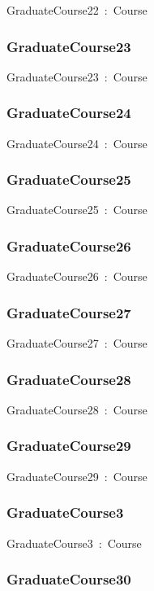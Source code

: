 \documentclass{article}
\begin{document}
GraduateCourse22~:~Course

\subsubsection*{GraduateCourse23}

GraduateCourse23~:~Course

\subsubsection*{GraduateCourse24}

GraduateCourse24~:~Course

\subsubsection*{GraduateCourse25}

GraduateCourse25~:~Course

\subsubsection*{GraduateCourse26}

GraduateCourse26~:~Course

\subsubsection*{GraduateCourse27}

GraduateCourse27~:~Course

\subsubsection*{GraduateCourse28}

GraduateCourse28~:~Course

\subsubsection*{GraduateCourse29}

GraduateCourse29~:~Course

\subsubsection*{GraduateCourse3}

GraduateCourse3~:~Course

\subsubsection*{GraduateCourse30}
\end{document}
